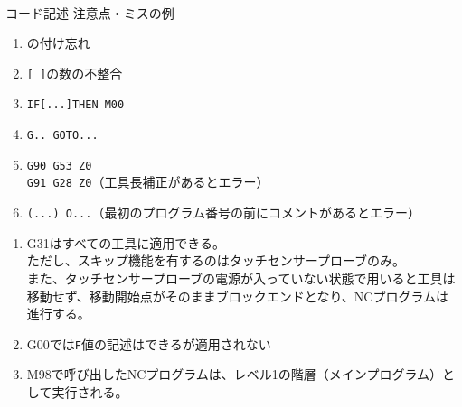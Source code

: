 \begin{appendices}
\Appendixpart


\clearpage
~\vfill
\begin{Column}{コード記述 注意点・ミスの例}
\begin{enumerate}
\item \ttNum\hx の付け忘れ
\item \verb|[ ]|の数の不整合
\item \verb|IF[...]THEN M00|
\item \verb|G.. GOTO...|
\item \verb|G90 G53 Z0|\\
      \verb|G91 G28 Z0|（工具長補正があるとエラー）
\item \verb|(...) O...|（最初のプログラム番号の前にコメントがあるとエラー）
\end{enumerate}
\tcbline*
\begin{enumerate}
\item
{\ttfamily G31}はすべての工具に適用できる。\\
ただし、スキップ機能を有するのはタッチセンサープローブのみ。\\
また、タッチセンサープローブの電源が入っていない状態で用いると工具は移動せず、移動開始点がそのままブロックエンドとなり、NCプログラムは進行する。
\item {\ttfamily G00}では\verb|F|値の記述はできるが適用されない
\item {\ttfamily M98}で呼び出したNCプログラムは、レベル1の階層（メインプログラム）として実行される。
\end{enumerate}
\end{Column}
\end{appendices}


